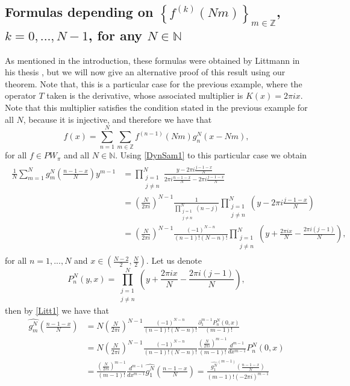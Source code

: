 \documentclass[reqno]{amsart}
\theoremstyle{plain}
\theoremstyle{definition}
\numberwithin{equation}{section}
\newcommand{\Z}{{\mathbb Z}}
\newcommand{\N}{{\mathbb N}}
\newcommand{\pa}[1]{\left(#1\right)}
\newcommand{\suc}[1]{\left\{#1\right\}}
\begin{document}
\subsection{Formulas depending on $\suc{f^{(k)}(Nm)}_{m\in\Z}$, $k=0,...,N-1$, for any $N\in\N$} 
As mentioned in the introduction, these formulas were obtained by Littmann in his thesis \cite{Li2003}, but we will now give an alternative proof of this result using our theorem. Note that, this is a particular case for the previous example, where the operator $T$ taken is the derivative, whose associated multiplier is $K(x)=2\pi i x$. Note that this multiplier satisfies the condition stated in the previous example for all $N$, because it is injective, and therefore we have that
$$f(x)=\sum_{n=1}^N \sum_{m\in\Z} f^{(n-1)}(Nm) g^N_n(x-Nm),$$
for all $f\in PW_\pi$ and all $N\in\N$. Using \eqref{DynSam1} to this particular case we obtain
\begin{align}\begin{split}\label{Litt1}
	\frac{1}{N} \sum_{m=1}^N \widehat{g^N_m}\pa{\frac{n-1-x}{N}} y^{m-1}
	&= \prod^N_{\substack{ j=1 \\ j\neq n}} \frac{y-2\pi i \frac{j-1-x}{N}}{2\pi i \frac{n-1-x}{N}-2\pi i \frac{j-1-x}{N}} \\
	&= \pa{\frac{N}{2\pi i}}^{N-1}\frac{1}{\prod^N_{\substack{ j=1 \\ j\neq n}}(n-j)}
	\prod^N_{\substack{ j=1 \\ j\neq n}} \pa{y-2\pi i \frac{j-1-x}{N}} \\
	&= \pa{\frac{N}{2\pi i}}^{N-1}\frac{(-1)^{N-n}}{(n-1)!(N-n)!}
	\prod^N_{\substack{ j=1 \\ j\neq n}} \pa{y+\frac{2\pi i x}{N}-\frac{2\pi i(j-1)}{N}},
\end{split}\end{align}
for all $n=1,...,N$ and $x\in\pa{\frac{N-2}{2},\frac{N}{2}}$. Let us denote
$$P_n^N(y,x)=\prod^N_{\substack{ j=1 \\ j\neq n}} \pa{y+\frac{2\pi i x}{N}-\frac{2\pi i(j-1)}{N}},$$
then by \eqref{Litt1} we have that
\begin{align*}
	\widehat{g^N_m}\pa{\frac{n-1-x}{N}}
	&= N \pa{\frac{N}{2\pi i}}^{N-1}\frac{(-1)^{N-n}}{(n-1)!(N-n)!} \frac{\partial_1 ^{m-1} P_n^N(0,x)}{(m-1)!} \\
	&= N \pa{\frac{N}{2\pi i}}^{N-1}\frac{(-1)^{N-n}}{(n-1)!(N-n)!} \frac{\pa{\frac{N}{2\pi i}}^{m-1}}{(m-1)!}
	\frac{d^{m-1}}{dx^{m-1}} P_n^N (0,x) \\
	&= \frac{\pa{\frac{N}{2\pi i}}^{m-1}}{(m-1)!}
	\frac{d^{m-1}}{dx^{m-1}} \widehat{g^N_1}\pa{\frac{n-1-x}{N}}
	= \frac{\widehat{g^N_1}^{(m-1)}\pa{\frac{n-1-x}{N}}}{(m-1)!(-2\pi i)^{m-1}}
\end{align*}
\end{document}
